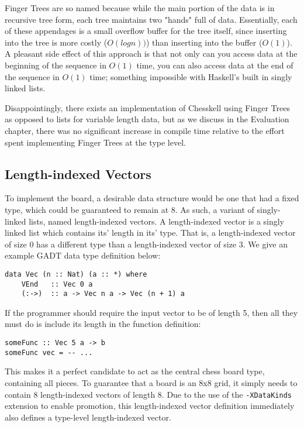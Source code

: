 \documentclass[12pt, a4paper, bibliography=totocnumbered]{scrreprt}
\newcommand{\inline}[1]{\lstinline[basicstyle=\ttfamily\footnotesize]{#1}}
\begin{document}
Finger Trees are so named because while the main portion of the data is in recursive tree form, each tree maintains two "hands" full of data. Essentially, each of these appendages is a small overflow buffer for the tree itself, since inserting into the tree is more costly ($O(log n))$) than inserting into the buffer ($O(1)$). A pleasant side effect of this approach is that not only can you access data at the beginning of the sequence in $O(1)$ time, you can also access data at the end of the sequence in $O(1)$ time; something impossible with Haskell's built in singly linked lists.

Disappointingly, there exists an implementation of Chesskell using Finger Trees as opposed to lists for variable length data, but as we discuss in the Evaluation chapter, there was no significant increase in compile time relative to the effort spent implementing Finger Trees at the type level.

\subsection{Length-indexed Vectors}

To implement the board, a desirable data structure would be one that had a fixed type, which could be guaranteed to remain at 8. As such, a variant of singly-linked lists, named length-indexed vectors. A length-indexed vector is a singly linked list which contains its' length in its' type. That is, a length-indexed vector of size 0 has a different type than a length-indexed vector of size 3. We give an example GADT data type definition below:

\begin{lstlisting}
data Vec (n :: Nat) (a :: *) where
    VEnd   :: Vec 0 a
    (:->)  :: a -> Vec n a -> Vec (n + 1) a
\end{lstlisting}

If the programmer should require the input vector to be of length 5, then all they must do is include its length in the function definition:

\begin{lstlisting}
someFunc :: Vec 5 a -> b
someFunc vec = -- ...
\end{lstlisting}

This makes it a perfect candidate to act as the central chess board type, containing all pieces. To guarantee that a board is an 8x8 grid, it simply needs to contain 8 length-indexed vectors of length 8. Due to the use of the \inline{-XDataKinds} extension to enable promotion, this length-indexed vector definition immediately also defines a type-level length-indexed vector.
\end{document}
